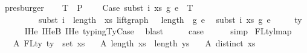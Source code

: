 \begin{isabellebody}
\ presburger\isanewline
\isanewline
\ \ \isamarkupfalse%
\ T{}{\isacharcolon}{\kern0pt}\ {\isachardoublequoteopen}{\isasymGamma}{}\ {\isasymturnstile}{\isacharbraceleft}{\kern0pt}P{\isacharbraceright}{\kern0pt}\isanewline
\ \ \ \ Case\ {\isacharparenleft}{\kern0pt}subst\ i\ xs\ g{}\ e{}{\isacharparenright}{\kern0pt}\ {\isasymGamma}{}{\isacharprime}{\kern0pt}\ T\isanewline
\ \ \ \ \ \ \ \ \ {\isacharparenleft}{\kern0pt}subst\ {\isacharparenleft}{\kern0pt}i\ {\isacharplus}{\kern0pt}\ length\ {\isasymGamma}{}{\isacharprime}{\kern0pt}{\isacharparenright}{\kern0pt}\ xs\ {\isacharparenleft}{\kern0pt}{\isacharparenleft}{\kern0pt}lift{\isacharunderscore}{\kern0pt}graph\ {}\ {\isacharcircum}{\kern0pt}{\isacharcircum}{\kern0pt}\ {\isacharparenleft}{\kern0pt}length\ {\isasymGamma}{}{\isacharprime}{\kern0pt}{\isacharparenright}{\kern0pt}{\isacharparenright}{\kern0pt}\ g{}{\isacharparenright}{\kern0pt}\ e{}{\isacharparenright}{\kern0pt}\isanewline
\ \ {\isacharparenleft}{\kern0pt}subst\ i\ xs\ g{}\ e{}{\isacharparenright}{\kern0pt}\isanewline
\ \ \ \ {\isacharcolon}{\kern0pt}\ ty{}{\isacharprime}{\kern0pt}{\isachardoublequoteclose}\isanewline
\ \ \ \ \isamarkupfalse%
\ IHe{}\ IHe{}B\ IHe{}\ typing{\isachardot}{\kern0pt}TyCase\ \isamarkupfalse%
\ blast\isanewline
\ \ \isamarkupfalse%
\ \isamarkupfalse%
\ {\isacharquery}{\kern0pt}case\isanewline
\ \ \ \ \isamarkupfalse%
\ simp\isanewline
{}\isamarkupfalse%
%
\endisatagproof
{\isafoldproof}%
%
\isadelimproof
%
\endisadelimproof
%
\isadelimdocument
%
\endisadelimdocument
%
\isatagdocument
%
\isamarkuptrue%
%
\endisatagdocument
{\isafolddocument}%
%
\isadelimdocument
%
\endisadelimdocument
{}\isamarkupfalse%
\ FL{\isacharunderscore}{\kern0pt}ty{\isacharunderscore}{\kern0pt}lmap{\isacharcolon}{\kern0pt}\isanewline
\ \ \ A{}{\isacharcolon}{\kern0pt}\ {\isachardoublequoteopen}FLty\ ty\ {\isacharequal}{\kern0pt}\ set\ xs{\isachardoublequoteclose}\isanewline
\ \ \ A{}{\isacharcolon}{\kern0pt}\ {\isachardoublequoteopen}length\ xs\ {\isacharequal}{\kern0pt}\ length\ ys{\isachardoublequoteclose}\isanewline
\ \ \ A{}{\isacharcolon}{\kern0pt}\ {\isachardoublequoteopen}distinct\ xs{\isachardoublequoteclose}\isanewline

\end{isabellebody}
